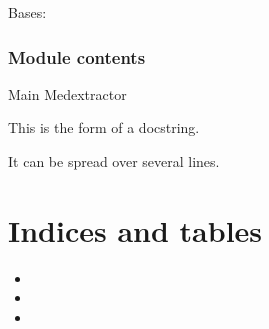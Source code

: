 \documentclass[letterpaper,10pt,english]{sphinxmanual}
\begin{document}
\begin{fulllineitems}
\label{\detokenize{medextractor:medextractor.ruler_creator.RulerCreator}}
\pysigstartsignatures
{}
\pysigstopsignatures
\sphinxAtStartPar
Bases: 

\begin{fulllineitems}
\label{\detokenize{medextractor:medextractor.ruler_creator.RulerCreator.load}}
\pysigstartsignatures
{}
\pysigstopsignatures
\end{fulllineitems}


\begin{fulllineitems}
\label{\detokenize{medextractor:medextractor.ruler_creator.RulerCreator.save}}
\pysigstartsignatures
{}
\pysigstopsignatures
\end{fulllineitems}


\end{fulllineitems}



\subsection{Module contents}
\label{\detokenize{medextractor:module-medextractor}}\label{\detokenize{medextractor:module-contents}}
\sphinxAtStartPar
Main Medextractor

\sphinxAtStartPar
This is the form of a docstring.

\sphinxAtStartPar
It can be spread over several lines.


\chapter{Indices and tables}
\label{\detokenize{index:indices-and-tables}}\begin{itemize}
\item {} 
\sphinxAtStartPar
{}

\item {} 
\sphinxAtStartPar
{}

\item {} 
\sphinxAtStartPar
{}

\end{itemize}
\end{document}
